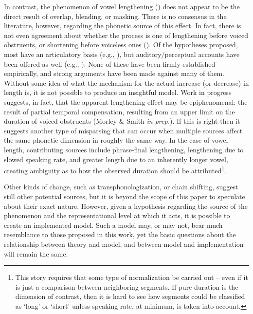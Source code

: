 In contrast, the phenomenon of vowel lengthening ()
does not appear to be the direct result of overlap, blending, or masking.
There is no consensus in the literature, however, regarding the phonetic
source of this effect. In fact, there is not even agreement about
whether the process is one of lengthening before voiced obstruents,
or shortening before voiceless ones (\citealt{gimson1970introduction,wells1982accents}).
Of the hypotheses proposed, most have an articulatory basis (e.g.,
\citealt{belasco1958variations,delattre1962some,chen1970vowel,lisker1974explaining,Klatt1976,moreton2004realization,schwartz2010phonology}),
but auditory/perceptual accounts have been offered as well (e.g.,
\citealt{lisker1957closure,javkin1977phonetic,Kluender1988}). None
of these have been firmly established empirically, and strong arguments
have been made against many of them. Without some idea of what the
mechanism for the actual increase (or decrease) in length is, it is
not possible to produce an insightful model. Work in progress suggests,
in fact, that the apparent lengthening effect may be epiphenomenal:
the result of partial temporal compensation, resulting from an upper
limit on the duration of voiced obstruents (Morley \& Smith \emph{in
prep.}). If this is right then it suggests another type of misparsing
that can occur when multiple sources affect the same phonetic dimension
in roughly the same way. In the case of vowel length, contributing
sources include phrase-final lengthening, lengthening due to slowed
speaking rate, and greater length due to an inherently longer vowel,
creating ambiguity as to how the observed duration should be attributed\footnote{This story requires that some type of normalization be carried out
– even if it is just a comparison between neighboring segments. If
pure duration is the dimension of contrast, then it is hard to see
how segments could be classified as `long' or `short' unless speaking
rate, at minimum, is taken into account.}.

Other kinds of change, such as transphonologization, or chain shifting,
suggest still other potential sources, but it is beyond the scope
of this paper to speculate about their exact nature. However, given
a hypothesis regarding the source of the phenomenon and the representational
level at which it acts, it is possible to create an implemented model.
Such a model may, or may not, bear much resemblance to those proposed
in this work, yet the basic questions about the relationship between
theory and model, and between model and implementation will remain
the same. 

